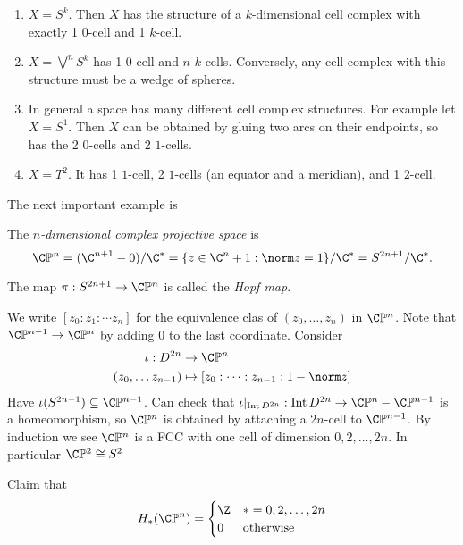 \documentclass[a4paper]{article}
\DeclareMathOperator{\Int}{Int} %
\renewcommand*{\P}{\mathbb{P}}
\begin{document}
\begin{eg}\leavevmode
  \begin{enumerate}
  \item \(X = S^k\). Then \(X\) has the structure of a \(k\)-dimensional cell complex with exactly 1 \(0\)-cell and 1 \(k\)-cell.
  \item \(X = \bigvee^n S^k\) has 1 \(0\)-cell and \(n\) \(k\)-cells. Conversely, any cell complex with this structure must be a wedge of spheres.
  \item In general a space has many different cell complex structures. For example let \(X = S^1\). Then \(X\) can be obtained by gluing two arcs on their endpoints, so has the 2 \(0\)-cells and 2 \(1\)-cells.
  \item \(X = T^2\). It has 1 \(1\)-cell, 2 \(1\)-cells (an equator and a meridian), and 1 \(2\)-cell.
  \end{enumerate}
\end{eg}

The next important example is

\begin{definition}
  The \emph{\(n\)-dimensional complex projective space} is
  \[
    \C\P^n
    = (\C^{n + 1} - 0)/\C^*
    = \{z \in \C^n + 1: \norm z = 1\}/\C^*
    = S^{2n + 1}/\C^*.
  \]

  The map \(\pi: S^{2n + 1} \to \C\P^n\) is called the \emph{Hopf map}.
\end{definition}

We write \([z_0: z_1: \cdots z_n]\) for the equivalence clas of \((z_0, \dots, z_n)\) in \(\C\P^n\). Note that \(\C\P^{n - 1} \to \C\P^n\) by adding \(0\) to the last coordinate. Consider
\begin{align*}
  \iota: D^{2n} &\to \C\P^n \\
  (z_0, \dots z_{n - 1}) &\mapsto [z_0: \cdots : z_{n - 1}: 1 - \norm z]
\end{align*}
Have \(\iota(S^{2n - 1}) \subseteq \C\P^{n - 1}\). Can check that \(\iota|_{\Int D^{2n}}: \Int D^{2n} \to \C\P^n - \C\P^{n - 1}\) is a homeomorphism, so \(\C\P^n\) is obtained by attaching a \(2n\)-cell to \(\C\P^{n - 1}\). By induction we see \(\C\P^n\) is a FCC with one cell of dimension \(0, 2, \dots, 2n\). In particular \(\C\P^2 \cong S^2\)

Claim that
\[
  H_*(\C\P^n) =
  \begin{cases}
    \Z & * = 0, 2, \dots, 2n \\
    0 & \text{otherwise}
  \end{cases}
\]
\end{document}
